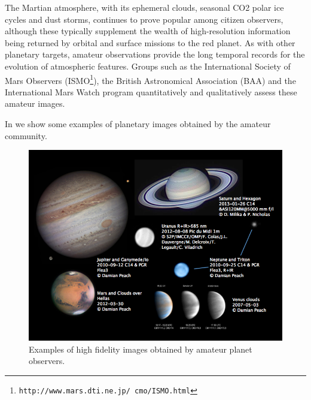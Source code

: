 \documentclass{ar2e}
\begin{document}
The Martian atmosphere, with its ephemeral clouds,
seasonal CO2 polar ice cycles and dust storms, continues to prove popular among
citizen observers, although these typically supplement the wealth of
high-resolution information being returned by orbital and surface missions to
the red planet.  As with other planetary targets, amateur observations provide
the long temporal records for the evolution of atmospheric features.  Groups
such as the International Society of Mars Observers
(ISMO\footnote{\texttt{http://www.mars.dti.ne.jp/~cmo/ISMO.html}}), the British
Astronomical Association (BAA) and the International Mars Watch program
quantitatively and qualitatively assess these amateur images. 

In  we show some examples of planetary images obtained
by the amateur community.

\begin{figure}[!ht]
\centering\includegraphics[width=\linewidth]{figs/planets.png}
\caption{Examples of high fidelity images obtained by amateur planet observers.}
\label{fig:planets}
\end{figure}
\end{document}
